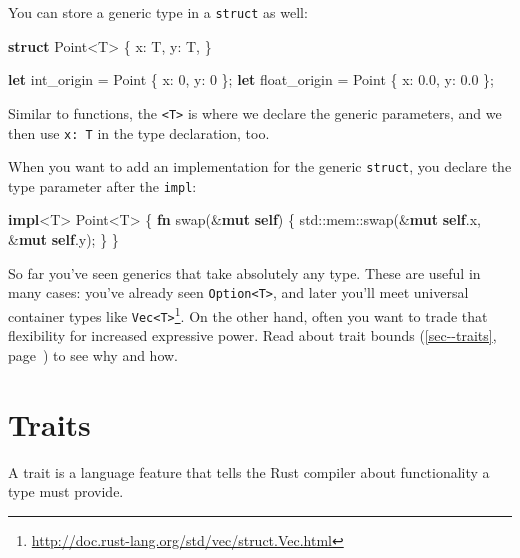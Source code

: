 \documentclass[a4paper,]{book}
\renewcommand*{\hypertarget}[3][\ar]{%
  \def\ar{#2}%
  \label{#1}%
  #3}
\renewcommand*{\hyperlink}[2]{%
 #2 (\autoref{#1}, page~\pageref{#1})}
\newenvironment{Shaded}{\begin{snugshade}}{\end{snugshade}}
\newcommand{\KeywordTok}[1]{\textcolor[rgb]{0.13,0.29,0.53}{\textbf{{#1}}}}
\newcommand{\DecValTok}[1]{\textcolor[rgb]{0.00,0.00,0.81}{{#1}}}
\newcommand{\NormalTok}[1]{{#1}}
\renewcommand{\href}[2]{#2\footnote{\url{#1}}}
\begin{document}
You can store a generic type in a \texttt{struct} as well:

\begin{Shaded}
\begin{Highlighting}[]
\KeywordTok{struct} \NormalTok{Point<T> \{}
    \NormalTok{x: T,}
    \NormalTok{y: T,}
\NormalTok{\}}

\KeywordTok{let} \NormalTok{int_origin = Point \{ x: }\DecValTok{0}\NormalTok{, y: }\DecValTok{0} \NormalTok{\};}
\KeywordTok{let} \NormalTok{float_origin = Point \{ x: }\DecValTok{0.0}\NormalTok{, y: }\DecValTok{0.0} \NormalTok{\};}
\end{Highlighting}
\end{Shaded}

Similar to functions, the \texttt{\textless{}T\textgreater{}} is where
we declare the generic parameters, and we then use \texttt{x:\ T} in the
type declaration, too.

When you want to add an implementation for the generic \texttt{struct},
you declare the type parameter after the \texttt{impl}:

\begin{Shaded}
\begin{Highlighting}[]
\KeywordTok{impl}\NormalTok{<T> Point<T> \{}
    \KeywordTok{fn} \NormalTok{swap(&}\KeywordTok{mut} \KeywordTok{self}\NormalTok{) \{}
        \NormalTok{std::mem::swap(&}\KeywordTok{mut} \KeywordTok{self}\NormalTok{.x, &}\KeywordTok{mut} \KeywordTok{self}\NormalTok{.y);}
    \NormalTok{\}}
\NormalTok{\}}
\end{Highlighting}
\end{Shaded}

So far you've seen generics that take absolutely any type. These are
useful in many cases: you've already seen
\texttt{Option\textless{}T\textgreater{}}, and later you'll meet
universal container types like
\href{http://doc.rust-lang.org/std/vec/struct.Vec.html}{\texttt{Vec\textless{}T\textgreater{}}}.
On the other hand, often you want to trade that flexibility for
increased expressive power. Read about
\protect\hyperlink{sec--traits}{trait bounds} to see why and how.

\hypertarget{sec--traits}{\section{Traits}\label{sec--traits}}

A trait is a language feature that tells the Rust compiler about
functionality a type must provide.
\end{document}
